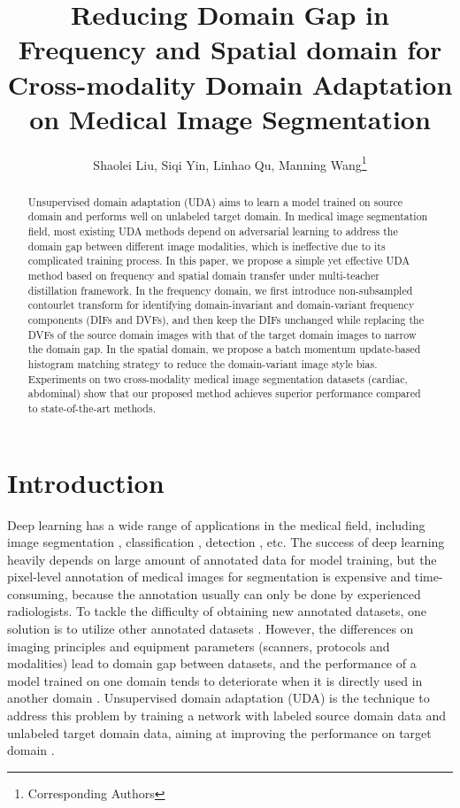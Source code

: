 \documentclass[letterpaper]{article} %
\title{Reducing Domain Gap in Frequency and Spatial domain for Cross-modality Domain Adaptation on Medical Image Segmentation}
\author{
    Shaolei Liu\equalcontrib,
    Siqi Yin\equalcontrib,
    Linhao Qu,
    Manning Wang\thanks{Corresponding Authors}
}
\begin{document}
\maketitle

\begin{abstract}
    Unsupervised domain adaptation (UDA) aims to learn a model trained on source domain and performs well on unlabeled target domain. 
    In medical image segmentation field, most existing UDA methods depend on adversarial learning to address the domain gap between different 
    image modalities, which is ineffective due to its complicated training process. In this paper, we propose a simple yet effective UDA method 
    based on frequency and spatial domain transfer under multi-teacher distillation framework. In the frequency domain, we first introduce 
    non-subsampled contourlet transform for identifying domain-invariant and domain-variant frequency components (DIFs and DVFs), and then 
    keep the DIFs unchanged while replacing the DVFs of the source domain images with that of the target domain images to narrow the domain 
    gap. In the spatial domain, we propose a batch momentum update-based histogram matching strategy to reduce the domain-variant image style bias. 
    Experiments on two cross-modality medical image segmentation datasets (cardiac, abdominal) show that our proposed method achieves superior 
    performance compared to state-of-the-art methods.
\end{abstract}

\section{Introduction}
Deep learning has a wide range of applications in the medical field, including image segmentation \cite{1,2}, classification \cite{3,4}, 
detection \cite{5,6}, etc. The success of deep learning heavily depends on large amount of annotated data for model training, but the pixel-level 
annotation of medical images for segmentation is expensive and time-consuming, because the annotation usually can only be done by experienced radiologists.
 To tackle the difficulty of obtaining new annotated datasets, one solution is to utilize other annotated datasets \cite{8,9}. However, the 
 differences on imaging principles and equipment parameters (scanners, protocols and modalities) lead to 
 domain gap between datasets, and the performance of a model trained on one domain tends to deteriorate when it is directly used in another 
 domain \cite{2,10,11}. Unsupervised domain adaptation (UDA) is the technique to address this problem by training a network with labeled 
 source domain data and unlabeled target domain data, aiming at improving the performance on target domain \cite{12}.
\end{document}
